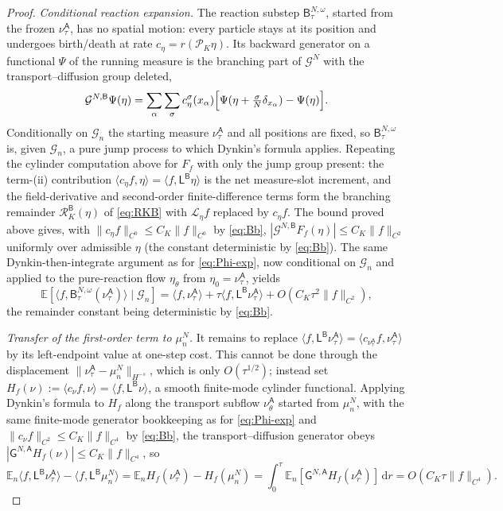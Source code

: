 \documentclass[a4paper,fleqn]{cas-sc}
\theoremstyle{definition}
\theoremstyle{remark}
\begin{document}
\begin{proof}
\emph{Conditional reaction expansion.} The reaction substep $\mathsf B^{N,\omega}_\tau$, started from
the frozen $\nu^{\mathsf A}_\tau$, has no spatial motion: every particle stays at its position and
undergoes birth/death at rate $c_\eta=r(\mathcal P_K\eta)$. Its backward generator on a functional
$\Psi$ of the running measure is the branching part of $\mathcal G^N$ with the transport--diffusion
group deleted,
\[
\mathcal G^{N,\mathsf B}\Psi(\eta)
=\sum_\alpha\sum_{\sigma}c^\sigma_\eta(x_\alpha)\Bigl[\Psi(\eta+\tfrac{\sigma}N\delta_{x_\alpha})-\Psi(\eta)\Bigr].
\]
Conditionally on $\mathcal G_n$ the starting measure $\nu^{\mathsf A}_\tau$ and all positions are
fixed, so $\mathsf B^{N,\omega}_\tau$ is, given $\mathcal G_n$, a pure jump process to which Dynkin's
formula applies. Repeating the cylinder computation above for $F_f$ with only the jump group present:
the term-(ii) contribution $\langle c_\eta f,\eta\rangle=\langle f,\mathsf L^{\mathsf B}\eta\rangle$ is
the net measure-slot increment, and the field-derivative and second-order finite-difference terms form
the branching remainder $\mathcal R_K^{\mathsf B}(\eta)$ of \eqref{eq:RKB} with $\mathcal L_\eta f$
replaced by $c_\eta f$. The bound proved above gives, with $\|c_\eta f\|_{C^0}\le C_K\|f\|_{C^0}$ by
\eqref{eq:Bb}, $|\mathcal G^{N,\mathsf B}F_f(\eta)|\le C_K\|f\|_{C^2}$ uniformly over admissible
$\eta$ (the constant deterministic by \eqref{eq:Bb}). The same Dynkin-then-integrate argument as for
\eqref{eq:Phi-exp}, now conditional on $\mathcal G_n$ and applied to the pure-reaction flow
$\eta_\theta$ from $\eta_0=\nu^{\mathsf A}_\tau$, yields
\[
\mathbb E[\langle f,\mathsf B^{N,\omega}_\tau(\nu^{\mathsf A}_\tau)\rangle\mid\mathcal G_n]
=\langle f,\nu^{\mathsf A}_\tau\rangle+\tau\langle f,\mathsf L^{\mathsf B}\nu^{\mathsf A}_\tau\rangle
+O(C_K\tau^2\|f\|_{C^2}),
\]
the remainder constant being deterministic by \eqref{eq:Bb}.

\emph{Transfer of the first-order term to $\mu^N_n$.} It remains to replace
$\langle f,\mathsf L^{\mathsf B}\nu^{\mathsf A}_\tau\rangle=\langle c_{\nu^{\mathsf A}_\tau}f,\nu^{\mathsf A}_\tau\rangle$
by its left-endpoint value at one-step cost. This cannot be done through the displacement
$\|\nu^{\mathsf A}_\tau-\mu^N_n\|_{H^{-s}}$, which is only $O(\tau^{1/2})$; instead set
$H_f(\nu):=\langle c_\nu f,\nu\rangle=\langle f,\mathsf L^{\mathsf B}\nu\rangle$, a smooth finite-mode
cylinder functional. Applying Dynkin's formula to $H_f$ along the transport subflow
$\nu^{\mathsf A}_\theta$ started from $\mu^N_n$, with the same finite-mode generator bookkeeping as for
\eqref{eq:Phi-exp} and $\|c_\nu f\|_{C^2}\le C_K\|f\|_{C^4}$ by \eqref{eq:Bb}, the transport--diffusion
generator obeys $|\mathsf G^{N,\mathsf A}H_f(\nu)|\le C_K\|f\|_{C^4}$, so
\[
\mathbb E_n\langle f,\mathsf L^{\mathsf B}\nu^{\mathsf A}_\tau\rangle-\langle f,\mathsf L^{\mathsf B}\mu^N_n\rangle
=\mathbb E_nH_f(\nu^{\mathsf A}_\tau)-H_f(\mu^N_n)
=\int_0^\tau\mathbb E_n[\mathsf G^{N,\mathsf A}H_f(\nu^{\mathsf A}_r)]\,\mathrm dr
=O(C_K\tau\|f\|_{C^4}).
\]


\end{proof}
\end{document}
